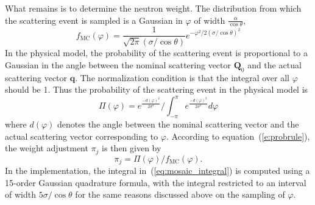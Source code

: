 What remains is to determine the neutron weight. The distribution from
which the scattering event is sampled is a Gaussian in $\varphi$ of
width $\frac{\alpha}{\cos\theta}$,
\begin{equation}
    f_\textrm{MC}(\varphi) = \frac{1}{\sqrt{2\pi}(\sigma/\cos\theta)}
            e^{-\varphi^2/2(\sigma/\cos\theta)^2}
\end{equation}
In the physical model, the probability of the scattering event is
proportional to a Gaussian in the angle between the nominal scattering
vector $\textbf{Q}_0$ and the actual scattering vector $\textbf{q}$. The
normalization condition is that the integral over all $\varphi$ should
be 1. Thus the probability of the scattering event in the physical model
is
\begin{equation}
  \label{eq:mosaic_integral}
  \Pi(\varphi) = e^{\frac{-d(\varphi)^2}{2\sigma^2}} /
   \int_{-\pi}^{\pi} e^{\frac{-d(\varphi)^2}{2\sigma^2}} d\varphi
\end{equation}
where $d(\varphi)$ denotes the angle between the nominal scattering
vector and the actual scattering vector corresponding to $\varphi$.
According to equation~(\ref{e:probrule}), the weight adjustment $\pi_j$ is
then given by
\begin{equation}
\pi_j = \Pi(\varphi) / f_\textrm{MC}(\varphi).
\end{equation}
In the implementation, the integral in~(\ref{eq:mosaic_integral}) is computed
using a 15-order Gaussian quadrature formula, with the integral
restricted to an interval of width $5\sigma/\cos\theta$ for the same
reasons discussed above on the sampling of $\varphi$.
